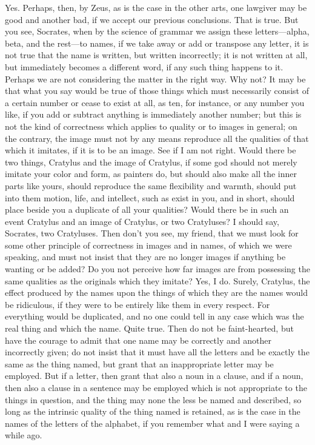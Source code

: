 {{{{{\cratylusspeaks
Yes.
\socratesspeaks
Perhaps, then, by Zeus, as is the case in the other arts, one lawgiver may be good and another bad, if we accept our previous conclusions.
\cratylusspeaks
That is true. But you see, Socrates, when by the science of grammar we assign these letters—alpha, beta, and the rest—to names,  if we take away or add or transpose any letter, it is not true that the name is written, but written incorrectly; it is not written at all, but immediately becomes a different word, if any such thing happens to it.
\socratesspeaks
Perhaps we are not considering the matter in the right way.
\cratylusspeaks
Why not?
\socratesspeaks
It may be that what you say would be true of those things which must necessarily consist of a certain number or cease to exist at all, as ten, for instance, or any number you like,  if you add or subtract anything is immediately another number; but this is not the kind of correctness which applies to quality or to images in general; on the contrary, the image must not by any means reproduce all the qualities of that which it imitates, if it is to be an image. See if I am not right. Would there be two things, Cratylus and the image of Cratylus, if some god should not merely imitate your color and form, as painters do, but should also make all the inner parts like yours, should reproduce  the same flexibility and warmth, should put into them motion, life, and intellect, such as exist in you, and in short, should place beside you a duplicate of all your qualities? Would there be in such an event Cratylus and an image of Cratylus, or two Cratyluses?
\cratylusspeaks
I should say, Socrates, two Cratyluses.
\socratesspeaks
Then don't you see, my friend, that we must look for some other principle of correctness in images and in names, of which we were speaking, and must not insist that they are no longer images  if anything be wanting or be added? Do you not perceive how far images are from possessing the same qualities as the originals which they imitate?
\cratylusspeaks
Yes, I do.
\socratesspeaks
Surely, Cratylus, the effect produced by the names upon the things of which they are the names would be ridiculous, if they were to be entirely like them in every respect. For everything would be duplicated, and no one could tell in any case which was the real thing and which the name.
\cratylusspeaks
Quite true.
\socratesspeaks
Then do not be faint-hearted, but have the courage to admit that one name may be correctly and another incorrectly given;  do not insist that it must have all the letters and be exactly the same as the thing named, but grant that an inappropriate letter may be employed. But if a letter, then grant that also a noun in a clause, and if a noun, then also a clause in a sentence may be employed which is not appropriate to the things in question, and the thing may none the less be named and described, so long as the intrinsic quality of the thing named is retained,  as is the case in the names of the letters of the alphabet, if you remember what \hermogenesspeaks and I were saying a while ago.
}}}}}
